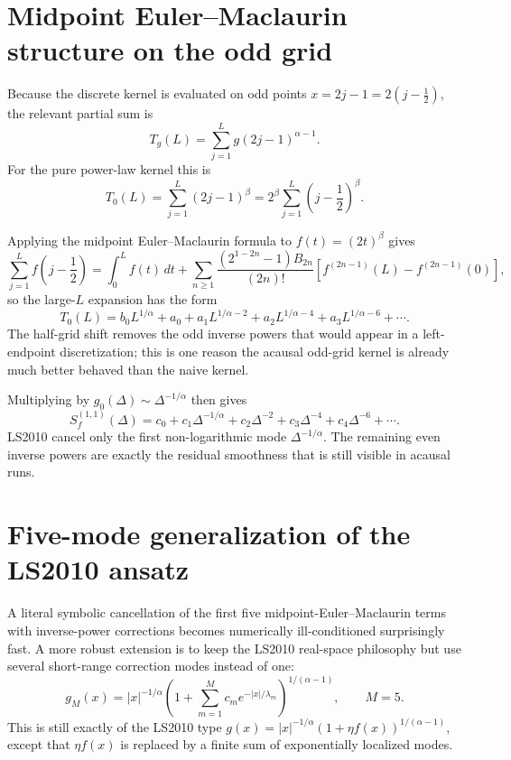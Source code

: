 \documentclass[11pt]{article}
\begin{document}
\section{Midpoint Euler--Maclaurin structure on the odd grid}

Because the discrete kernel is evaluated on odd points
\(
x=2j-1 = 2(j-\tfrac12)
\),
the relevant partial sum is
\begin{equation}
T_g(L)
=
\sum_{j=1}^{L} g(2j-1)^{\alpha-1}.
\end{equation}
For the pure power-law kernel this is
\begin{equation}
T_0(L)
=
\sum_{j=1}^{L} (2j-1)^\beta
=
2^\beta \sum_{j=1}^{L}\left(j-\frac12\right)^\beta.
\end{equation}

Applying the midpoint Euler--Maclaurin formula to
\(
f(t)=(2t)^\beta
\)
gives
\begin{equation}
\sum_{j=1}^{L} f\!\left(j-\frac12\right)
=
\int_0^{L} f(t)\,dt
+
\sum_{n\ge 1}
\frac{(2^{1-2n}-1)B_{2n}}{(2n)!}
\left[
f^{(2n-1)}(L)-f^{(2n-1)}(0)
\right],
\end{equation}
so the large-$L$ expansion has the form
\begin{equation}
T_0(L)
=
b_0 L^{1/\alpha}
+
a_0
+
a_1 L^{1/\alpha-2}
+
a_2 L^{1/\alpha-4}
+
a_3 L^{1/\alpha-6}
+\cdots .
\end{equation}
The half-grid shift removes the odd inverse powers that would appear in a
left-endpoint discretization; this is one reason the acausal odd-grid kernel is
already much better behaved than the naive kernel.

Multiplying by
\(
g_0(\Delta)\sim \Delta^{-1/\alpha}
\)
then gives
\begin{equation}
S_f^{(1,1)}(\Delta)
=
c_0
+
c_1 \Delta^{-1/\alpha}
+
c_2 \Delta^{-2}
+
c_3 \Delta^{-4}
+
c_4 \Delta^{-6}
+\cdots .
\end{equation}
LS2010 cancel only the first non-logarithmic mode
\(
\Delta^{-1/\alpha}
\).
The remaining even inverse powers are exactly the residual smoothness that is
still visible in acausal runs.

\section{Five-mode generalization of the LS2010 ansatz}

A literal symbolic cancellation of the first five midpoint-Euler--Maclaurin terms
with inverse-power corrections becomes numerically ill-conditioned surprisingly
fast.  A more robust extension is to keep the LS2010 real-space philosophy
but use several short-range correction modes instead of one:
\begin{equation}
g_M(x)
=
|x|^{-1/\alpha}
\left(
1+\sum_{m=1}^{M} c_m e^{-|x|/\lambda_m}
\right)^{1/(\alpha-1)},
\qquad M=5.
\label{eq:multi_ansatz}
\end{equation}
This is still exactly of the LS2010 type
\(
g(x)=|x|^{-1/\alpha}(1+\eta f(x))^{1/(\alpha-1)}
\),
except that
\(
\eta f(x)
\)
is replaced by a finite sum of exponentially localized modes.
\end{document}
